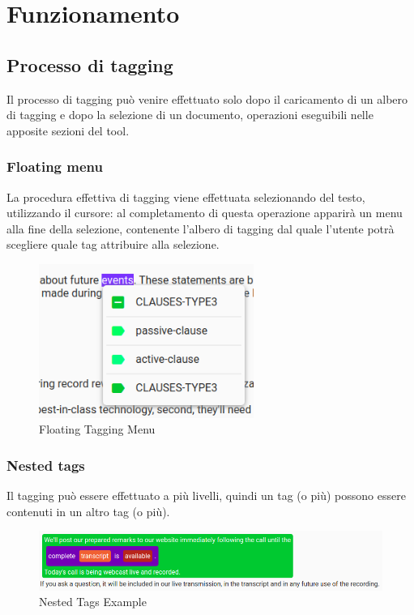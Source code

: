 \documentclass[twoside]{supsistudent}
\begin{document}
\chapter{Funzionamento}

\section{Processo di tagging}

Il processo di tagging può venire effettuato solo dopo il caricamento di un 
albero di tagging e dopo la selezione di un documento, operazioni eseguibili
nelle apposite sezioni del tool. 

\subsection{Floating menu}

La procedura effettiva di tagging viene effettuata selezionando del testo, 
utilizzando il cursore: al completamento di questa operazione apparirà un menu 
alla fine della selezione, contenente l'albero di tagging dal quale l'utente 
potrà scegliere quale tag attribuire alla selezione.

\begin{figure}[h!]
  \centering
  \includegraphics[width=7cm]{figures/floatingTag.png}
  \caption{Floating Tagging Menu}\label{fig:floatingTag}
\end{figure}

\pagebreak

\subsection{Nested tags}

Il tagging può essere effettuato a più livelli, quindi un tag (o più) possono
essere contenuti in un altro tag (o più).

\begin{figure}[h!]
  \includegraphics[width=\linewidth]{figures/nestedTags.png}
  \caption{Nested Tags Example}\label{fig:nestedTags}
\end{figure}
\end{document}
